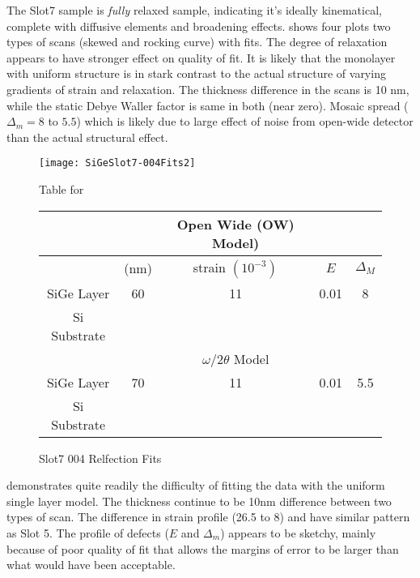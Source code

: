 The Slot7 sample is \emph{fully} relaxed sample, indicating it's ideally kinematical, complete with diffusive elements and broadening effects.   shows four plots two types of scans (skewed and rocking curve) with fits.  The degree of relaxation appears to have stronger effect on quality of fit.  It is likely that the monolayer with uniform structure is in stark contrast to the actual structure of varying gradients of strain and relaxation.  The thickness difference in the scans is 10 nm, while the static Debye Waller factor is same in both (near zero).  Mosaic spread ($\Delta_m =8$ to $5.5$) which is likely due to large effect of noise from open-wide detector than the actual structural effect.


\begin{figure}[hc]%
\caption{Slot7 004 Relfection Fits}
\label{Slot7-004}
\begin{minipage}{0.85\linewidth}
\texttt{[image: SiGeSlot7-004Fits2]}
\end{minipage}
\begin{minipage}{\linewidth}
\centering
\vspace{10pt}
Table for \\
\vspace{5pt}
\begin{tabular}{c|cccc}
			& 	&Open Wide (OW) Model)	 \\
\hline
			&	(nm)	&	strain	 $(10^{-3})$&	$E$ &  $\Delta_M$\\
\hline
SiGe Layer		&  	60	&      11	 &0.01 & 8	\\
Si Substrate		&	\textemdash & \textemdash&\textemdash\ &\textemdash	\\
\hline
			& &$\omega/2\theta$ Model \\
\hline
SiGe Layer		&	70	& 11	&0.01	& 5.5	\\
Si Substrate		&	\textemdash & \textemdash&\textemdash\ &\textemdash
\end{tabular}
\end{minipage}
\end{figure}

 demonstrates quite readily the difficulty of fitting the data with the uniform single layer model.  The thickness continue to be 10nm difference between two types of scan.  The difference in strain profile  (26.5 to 8) and have similar pattern as Slot 5.  The profile of defects ($E$ and $\Delta_m$) appears to be sketchy, mainly because of poor quality of fit that allows the margins of error to  be larger than what would have been acceptable.

